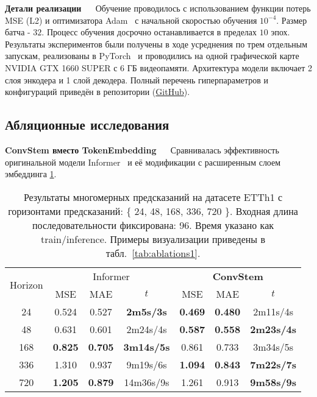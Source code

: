 \textbf{Детали реализации} $\quad$ Обучение проводилось с использованием функции потерь MSE (L2) 
и оптимизатора Adam~\cite{adam} с начальной скоростью обучения $10^{-4}$. 
Размер батча - $32$. Процесс обучения досрочно останавливается в пределах 
$10$ эпох. 
Результаты экспериментов были получены в ходе усреднения по трем отдельным запускам, 
реализованы в PyTorch~\cite{pytorch} и проводились на 
одной графической карте NVIDIA GTX 1660 SUPER с 6 ГБ видеопамяти. 
Архитектура модели включает 2 слоя энкодера и 1 слой декодера.
Полный перечень гиперпараметров и конфигураций приведён в репозитории (\href{https://github.com/namenick91/Convformer}{GitHub}).

\subsection{Абляционные исследования}

\label{sec:ablations1}
\textbf{ConvStem вместо TokenEmbedding} $\quad$ Сравнивалась эффективность 
оригинальной модели Informer~\cite{informer} и её модификации с 
расширенным слоем эмбеддинга \ref{tab:etth1-convstem}.


\begin{table}[!ht]
    \centering
    \begin{tabular}{c| ccc ccc}
    \toprule
    \multicolumn{1}{c}{\multirow{2}{*}{Horizon}} & 
    \multicolumn{3}{c}{Informer}                 & 
    \multicolumn{3}{c}{\textbf{ConvStem}}                 \\
    \cmidrule(lr){2-4} \cmidrule(lr){5-7}
    \multicolumn{1}{c}{} & {MSE} & {MAE} & {$t$} & {MSE} & {MAE} & {$t$} \\
    \midrule
    24   & 0.524 & 0.527 & \textbf{2m5s/3s} & \textbf{0.469} & \textbf{0.480} & 2m11s/4s \\
    48   & 0.631 & 0.601 & 2m24s/4s & \textbf{0.587} & \textbf{0.558} & \textbf{2m23s/4s} \\
    168  & \textbf{0.825} & \textbf{0.705} & \textbf{3m14s/5s} & 0.861 & 0.733 & 3m34s/5s \\
    336  & 1.310 & 0.937 & 9m19s/6s & \textbf{1.094} & \textbf{0.843} & \textbf{7m22s/7s} \\
    720  & \textbf{1.205} & \textbf{0.879} & 14m36s/9s & 1.261 & 0.913 & \textbf{9m58s/9s} \\
    \bottomrule
    \end{tabular}
    \vspace{3pt}
    \caption{Результаты многомерных предсказаний на датасете ETTh1 с 
    горизонтами предсказаний: \{ 24, 48, 168, 336, 720 \}. 
    Входная длина последовательности фиксирована: 96.
    Время указано как train/inference.
    Примеры визуализации приведены в табл.~\ref{tab:ablations1}.}
    \label{tab:etth1-convstem}
\end{table}

